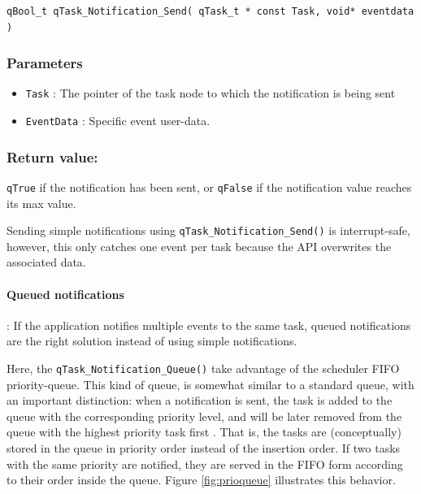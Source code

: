 \documentclass{article}
\begin{document}
\begin{lstlisting}[style=CStyle]
qBool_t qTask_Notification_Send( qTask_t * const Task, void* eventdata )
\end{lstlisting}

\subsubsection*{Parameters}
\begin{itemize}
    \item \lstinline{Task} : The pointer of the task node to which the notification is being sent 
    \item \lstinline{EventData} : Specific event user-data. 
\end{itemize}

\subsubsection*{Return value:}

\lstinline{qTrue} if the notification  has been sent, or \lstinline{qFalse} if the notification value reaches its max value. \\

\begin{tcolorbox}
\HandRight Sending simple notifications using \lstinline{qTask_Notification_Send()} is interrupt-safe, however, this only catches one event per task because the API overwrites the associated data.
\end{tcolorbox}

\paragraph{Queued notifications}
 : If the application notifies multiple events to the same task, queued notifications are the right solution instead of using simple notifications.

Here, the \lstinline{qTask_Notification_Queue()}  take advantage of the scheduler FIFO priority-queue. 
This kind of queue, is somewhat similar to a standard queue, with an important distinction: when a notification is sent, the task is added to the queue with the corresponding priority level, and will be later removed from the queue with the highest priority task first  \cite{cormen}. That is, the tasks are (conceptually) stored in the queue in priority order instead of the insertion order. If two tasks with the same priority are notified, they are served in the FIFO form according to their order inside the queue. Figure \ref{fig:prioqueue} illustrates this behavior.
\end{document}
